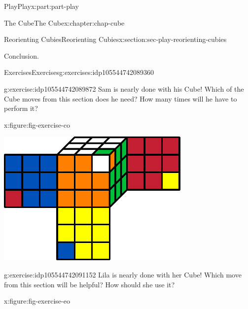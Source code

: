 \documentclass[oneside,10pt,]{book}
\numberwithin{equation}{section}
\begin{document}
\begin{partptx}{Play}{}{Play}{}{}{x:part:part-play}
\begin{chapterptx}{The Cube}{}{The Cube}{}{}{x:chapter:chap-cube}
\begin{sectionptx}{Reorienting Cubies}{}{Reorienting Cubies}{}{}{x:section:sec-play-reorienting-cubies}
\begin{conclusion}{Conclusion.}
\begin{itemize}[label=\textbullet]
\end{itemize}
%
\end{conclusion}%
%
%
\typeout{************************************************}
\typeout{************************************************}
%
\begin{exercises-subsection-numberless}{Exercises}{}{Exercises}{}{}{g:exercises:idp105544742089360}
\begin{divisionexercise}{1}{}{}{g:exercise:idp105544742089872}%
Sam is nearly done with his Cube! Which of the Cube moves from this section does he need? How many times will he have to perform it?%
\begin{figureptx}{}{x:figure:fig-exercise-co}{}%
\begin{image}{0.25}{0.5}{0.25}%
\includegraphics[width=\linewidth]{./images/co.pdf}
\end{image}%
\tcblower
\end{figureptx}%
\end{divisionexercise}%
\begin{divisionexercise}{2}{}{}{g:exercise:idp105544742091152}%
Lila is nearly done with her Cube! Which move from this section will be helpful? How should she use it?%
\begin{figureptx}{}{x:figure:fig-exercise-eo}{}%
\begin{image}{0.25}{0.5}{0.25}%

\end{image}
\end{figureptx}
\end{divisionexercise}
\end{exercises-subsection-numberless}
\end{sectionptx}
\end{chapterptx}
\end{partptx}
\end{document}
